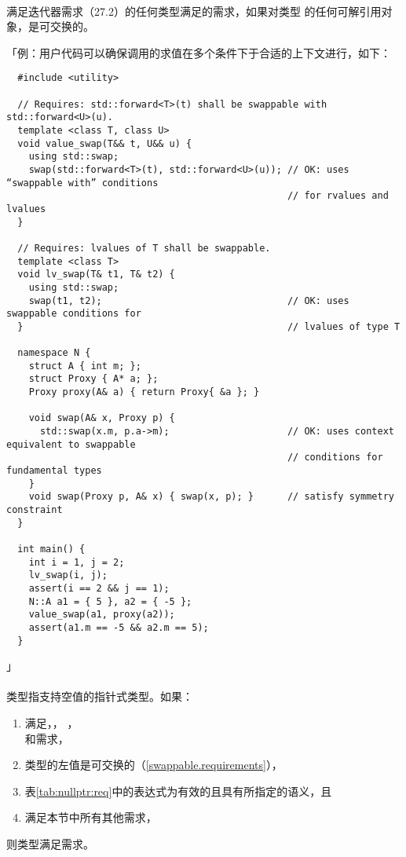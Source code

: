 \paragraph{}
满足迭代器需求（27.2）的任何类型满足的需求，如果对类型
的任何可解引用对象，是可交换的。

「例：用户代码可以确保调用的求值在多个条件下于合适的上下文进行，如下：
\begin{lstlisting}
  #include <utility>

  // Requires: std::forward<T>(t) shall be swappable with std::forward<U>(u).
  template <class T, class U>
  void value_swap(T&& t, U&& u) {
    using std::swap;
    swap(std::forward<T>(t), std::forward<U>(u)); // OK: uses “swappable with” conditions
                                                  // for rvalues and lvalues
  }

  // Requires: lvalues of T shall be swappable.
  template <class T>
  void lv_swap(T& t1, T& t2) {
    using std::swap;
    swap(t1, t2);                                 // OK: uses swappable conditions for
  }                                               // lvalues of type T

  namespace N {
    struct A { int m; };
    struct Proxy { A* a; };
    Proxy proxy(A& a) { return Proxy{ &a }; }

    void swap(A& x, Proxy p) {
      std::swap(x.m, p.a->m);                     // OK: uses context equivalent to swappable
                                                  // conditions for fundamental types
    }
    void swap(Proxy p, A& x) { swap(x, p); }      // satisfy symmetry constraint
  }

  int main() {
    int i = 1, j = 2;
    lv_swap(i, j);
    assert(i == 2 && j == 1);
    N::A a1 = { 5 }, a2 = { -5 };
    value_swap(a1, proxy(a2));
    assert(a1.m == -5 && a2.m == 5);
  }
\end{lstlisting}」

\paragraph{}
类型指支持空值的指针式类型。如果：
\begin{enumerate}
  \item{满足，，
    ，                                                  \\
    和需求，}
  \item{类型的左值是可交换的（\ref{swappable.requirements}），}
  \item{表\ref{tab:nullptr:req}中的表达式为有效的且具有所指定的语义，且}
  \item{满足本节中所有其他需求，}
\end{enumerate}
则类型满足需求。

